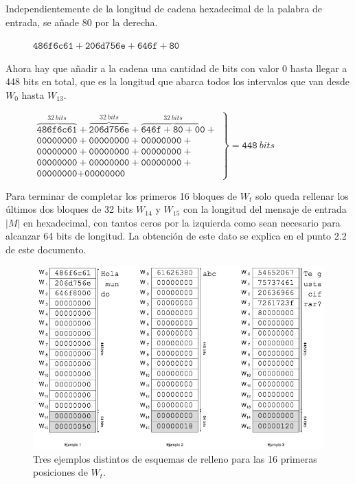 \documentclass{article}
\begin{document}
        Independientemente de la longitud de cadena hexadecimal de la palabra de entrada, se añade $80$ por la derecha.
            \begin{figure}[H]
            \centering
                $\texttt{486f6c61} + \texttt{206d756e} + \texttt{646f} + \texttt{80}$
            \end{figure}
        
        Ahora hay que añadir a la cadena una cantidad de bits con valor $0$ hasta llegar a 448 bits en total, que es la longitud que abarca todos los intervalos que van desde $W_{0}$ hasta $W_{13}$.
            \begin{figure}[H]
            \centering
                $\left .
                \begin{array}{l}
                    \overbrace{\texttt{486f6c61}}^{32 \ bits}+\overbrace{\texttt{206d756e}}^{32 \ bits}+\overbrace{\texttt{646f} + \texttt{80} + \texttt{00}}^{32 \ bits}+ \\
                    \texttt{00000000}+\texttt{00000000}+\texttt{00000000}+ \\
                    \texttt{00000000}+\texttt{00000000}+\texttt{00000000}+ \\
                    \texttt{00000000}+\texttt{00000000}+\texttt{00000000}+ \\
                    \texttt{00000000}+\texttt{00000000}
                \end{array}
                \right \} = \texttt{448} \ bits$
            \end{figure}

        Para terminar de completar los primeros 16 bloques de $W_{t}$ solo queda rellenar los últimos dos bloques de 32 bits $W_{14}$ y $W_{15}$ con la longitud del mensaje de entrada $|M|$ en hexadecimal, con tantos ceros por la izquierda como sean necesario para alcanzar 64 bits de longitud. La obtención de este dato se explica en el punto 2.2 de este documento.
            \begin{figure}[H]
            \centering
                \includegraphics[scale=0.49]{img/SHA-256-W0-W15}
                \caption{Tres ejemplos distintos de esquemas de relleno para las 16 primeras posiciones de $W_{t}$.}
            \end{figure}
\end{document}
